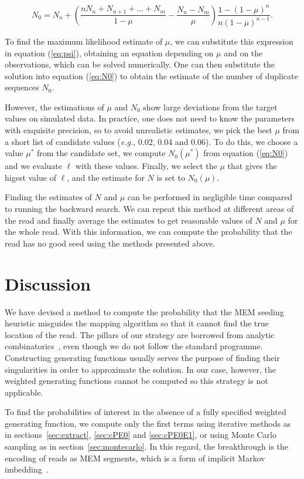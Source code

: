 \documentclass{article}
\begin{document}
\begin{equation*}
N_0 = N_n +
\left(\frac{nN_n+N_{n+1}+\ldots+N_m}{1-\mu}-
\frac{N_n-N_m}{\mu} \right)
\frac{1-(1-\mu)^n}{n(1-\mu)^{n-1}}.
\end{equation*}

To find the maximum likelihood estimate of $\mu$, we can substitute this
expression in equation (\ref{eq:psi}), obtaining an equation depending on
$\mu$ and on the observations, which can be solved numerically. One can
then substitute the solution into equation (\ref{eq:N0}) to obtain the
estimate of the number of duplicate sequences $N_0$.

However, the estimations of $\mu$ and $N_0$ show large deviations from the
target values on simulated data. In practice, one does not need to know
the parameters with exquisite precision, so to avoid unrealistic
estimates, we pick the best $\mu$ from a short list of candidate values
(\textit{e.g.}, 0.02, 0.04 and 0.06). To do this, we choose a value
$\mu^*$ from the candidate set, we compute $N_0(\mu^*)$ from equation
(\ref{eq:N0}) and we evaluate $\ell$ with these values. Finally, we select
the $\mu$ that gives the higest value of $\ell$, and the estimate for
$N$ is set to $N_0(\mu)$.

Finding the estimates of $N$ and $\mu$ can be performed in negligible time
compared to running the backward search. We can repeat this method at
different areas of the read and finally average the estimates to get
reasonable values of $N$ and $\mu$ for the whole read. With this
information, we can compute the probability that the read has no good seed
using the methods presented above.


\section{Discussion}

We have devised a method to compute the probability that the MEM seeding
heuristic misguides the mapping algorithm so that it cannot find the true
location of the read. The pillars of our strategy are borrowed from
analytic combinatorics~\cite{flajolet2009analytic,
sedgewick2013introduction}, even though we do not follow the standard
programme. Constructing generating functions usually serves the purpose of
finding their singularities in order to approximate the solution. In our
case, however, the weighted generating functions cannot be computed so
this strategy is not applicable.

To find the probabilities of interest in the absence of a fully specified
weighted generating function, we compute only the first terms using
iterative methods as in sections~\ref{sec:extract}, \ref{sec:cPE0} and
\ref{sec:cPE0E1}, or using Monte Carlo sampling as in
section~\ref{sec:montecarlo}. In this regard, the breakthrough is the
encoding of reads as MEM segments, which is a form of implicit Markov
imbedding~\cite{fu1994distribution}.
\end{document}
